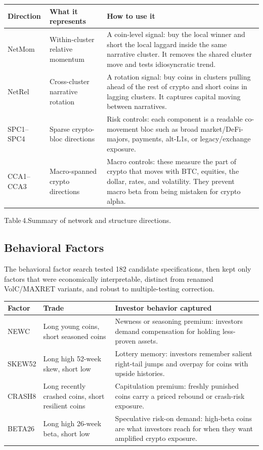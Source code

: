 \documentclass[11pt,a4paper]{article}
\begin{document}
\begin{center}
\small
\begin{tabularx}{\textwidth}{L{0.16\textwidth}L{0.24\textwidth}X}
\toprule
{}
\textbf{Direction} & \textbf{What it represents} & \textbf{How to use it} \\
\midrule
NetMom & Within-cluster relative momentum & A coin-level signal: buy the local winner and short the local laggard inside the same narrative cluster. It removes the shared cluster move and tests idiosyncratic trend. \\
NetRel & Cross-cluster narrative rotation & A rotation signal: buy coins in clusters pulling ahead of the rest of crypto and short coins in lagging clusters. It captures capital moving between narratives. \\
SPC1--SPC4 & Sparse crypto-bloc directions & Risk controls: each component is a readable co-movement bloc such as broad market/DeFi-majors, payments, alt-L1s, or legacy/exchange exposure. \\
CCA1--CCA3 & Macro-spanned crypto directions & Macro controls: these measure the part of crypto that moves with BTC, equities, the dollar, rates, and volatility. They prevent macro beta from being mistaken for crypto alpha. \\
\bottomrule
\end{tabularx}
\end{center}
\smallskip
{\small Table\,4.\;Summary of network and structure directions.}

\subsection{Behavioral Factors}

The behavioral factor search tested 182 candidate specifications, then kept only factors that were economically interpretable, distinct from renamed VolC/MAXRET variants, and robust to multiple-testing correction.

\begin{center}
\small
\begin{tabularx}{\textwidth}{L{0.13\textwidth}L{0.30\textwidth}X}
\toprule
{}
\textbf{Factor} & \textbf{Trade} & \textbf{Investor behavior captured} \\
\midrule
NEWC & Long young coins, short seasoned coins & Newness or seasoning premium: investors demand compensation for holding less-proven assets. \\
SKEW52 & Long high 52-week skew, short low & Lottery memory: investors remember salient right-tail jumps and overpay for coins with upside histories. \\
CRASH8 & Long recently crashed coins, short resilient coins & Capitulation premium: freshly punished coins carry a priced rebound or crash-risk exposure. \\
BETA26 & Long high 26-week beta, short low & Speculative risk-on demand: high-beta coins are what investors reach for when they want amplified crypto exposure. \\
\bottomrule
\end{tabularx}
\end{center}
\end{document}

